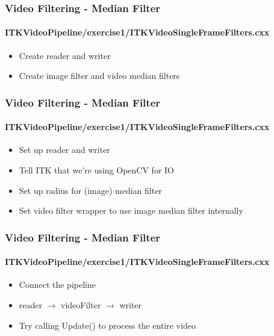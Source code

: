 {
\begin{frame}[fragile]
\frametitle{Video Filtering - Median Filter}
\framesubtitle{ITKVideoPipeline/exercise1/ITKVideoSingleFrameFilters.cxx}
\begin{itemize}
\item Create reader and writer
\pause

\item Create image filter and video median filters
\end{itemize}
\end{frame}
}

{
\begin{frame}[fragile]
\frametitle{Video Filtering - Median Filter}
\framesubtitle{ITKVideoPipeline/exercise1/ITKVideoSingleFrameFilters.cxx}
\begin{itemize}
\item Set up reader and writer
\item Tell ITK that we're using OpenCV for IO
\pause

\item Set up radius for (image) median filter
\item Set video filter wrapper to use image median filter internally
\end{itemize}
\end{frame}
}

{
\begin{frame}[fragile]
\frametitle{Video Filtering - Median Filter}
\framesubtitle{ITKVideoPipeline/exercise1/ITKVideoSingleFrameFilters.cxx}
\begin{itemize}
\item Connect the pipeline
\item reader $\rightarrow$ videoFilter $\rightarrow$ writer
\pause

\item Try calling Update() to process the entire video
\end{itemize}
\end{frame}
}


